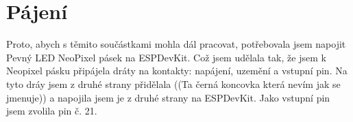 \section{Pájení}

Proto, abych s těmito součástkami mohla dál pracovat, potřebovala jsem napojit Pevný LED NeoPixel pásek na ESPDevKit. Což jsem udělala tak, že jsem k Neopixel pásku připájela dráty na kontakty: napájení, uzemění a vstupní pin. Na tyto dráy jsem z druhé strany přidělala ((Ta černá koncovka která nevím jak se jmenuje)) a napojila jsem je z druhé strany na ESPDevKit. Jako vstupní pin jsem zvolila pin č. 21.  



